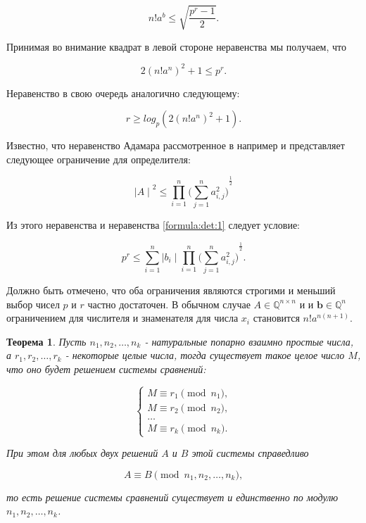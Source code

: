 \documentclass[master, och, diploma, times]{sty/SCWorks}
\theoremstyle{plain}
\newtheorem{thethm}{Теорема}[section]
\theoremstyle{definition}
\numberwithin{equation}{section}
\begin{document}
\begin{equation}\label{formula:det:1}
n!a^b \leq \sqrt{\frac{p^r-1}{2}}.
\end{equation}

Принимая во внимание квадрат в левой стороне неравенства мы получаем, что 

\begin{equation}
2{(n!a^n)}^2+1\leq p^r.
\end{equation}

\noindent Неравенство в свою очередь аналогично следующему:

\begin{equation} \label{eq:matrix:r}
r \geq log_p(2{(n!a^n)}^2+1).
\end{equation}

Известно, что неравенство Адамара рассмотренное в например \cite{bib:numbers:mignotte} и \cite{bib:numbers:marcus} представляет следующее ограничение для определителя:

\begin{equation}
{\mid A \mid}^2 \leq \prod\limits_{i=1}^{n}{\bigg(\sum\limits_{j=1}^{n} a^2_{i,j} \bigg)}^{\frac{1}{2}}
\end{equation}

\noindent Из этого неравенства и неравенства \ref{formula:det:1} следует условие:

\begin{equation}
p^r \leq \sum\limits_{i=1}^{n} {\mid b_i \mid} \prod\limits_{i=1}^{n}{\bigg(\sum\limits_{j=1}^{n} a^2_{i,j} \bigg)}^{\frac{1}{2}}.
\end{equation}

Должно быть отмечено, что оба ограничения являются строгими и меньший выбор чисел $p$ и $r$ частно достаточен. В обычном случае $A \in \mathbb{Q}^{n \times n}$ и и $\boldsymbol{b} \in \mathbb{Q}^{n}$ ограничением для числителя и знаменателя для числа $x_i$ становится $n!a^{n(n+1)}$. 

\begin{thethm}
Пусть $n_1,n_2,\dots, n_k$ - натуральные попарно взаимно простые числа, а $r_1,r_2,\dots,r_k$ - некоторые целые числа, тогда существует такое целое число $M$, что оно будет решением системы сравнений:

\begin{equation}
\begin{cases} 
M \equiv r_1 \pmod {n_1}, \\
M \equiv r_2 \pmod {n_2}, \\
\dots \\
M \equiv r_k \pmod {n_k}.
\end{cases}
\end{equation}

\noindent При этом для любых двух решений $A$ и $B$ этой системы справедливо

\begin{equation}
A \equiv B \pmod {n_1,n_2,\dots,n_k},
\end{equation}

\noindent то есть решение системы сравнений существует и единственно по модулю $n_1,n_2,\dots,n_k$.
\end{thethm}
\end{document}
